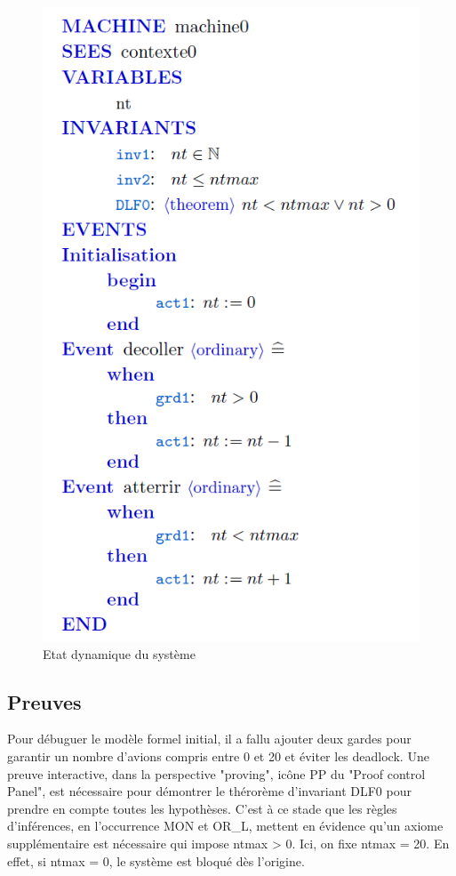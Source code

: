 \begin{figure}[H]
	\begin{center}	
		\includegraphics[scale=1]{images/0/machine0.png}
		\caption{Etat dynamique du système}
		\label{machine0}
	\end{center}
\end{figure}



\subsection{Preuves}
Pour débuguer le modèle formel initial, il a fallu ajouter deux gardes pour garantir un nombre d'avions compris entre 0 et 20 et éviter les deadlock.
Une preuve interactive, dans la perspective "proving", icône PP du "Proof control Panel", est nécessaire pour démontrer le thérorème d'invariant DLF0 pour prendre en compte toutes les hypothèses. C'est à ce stade que les règles d'inférences, en l'occurrence MON et OR\_L, mettent en évidence qu'un axiome supplémentaire est nécessaire qui impose ntmax > 0. Ici, on fixe ntmax = 20. En effet, si ntmax = 0, le système est bloqué dès l'origine. 

